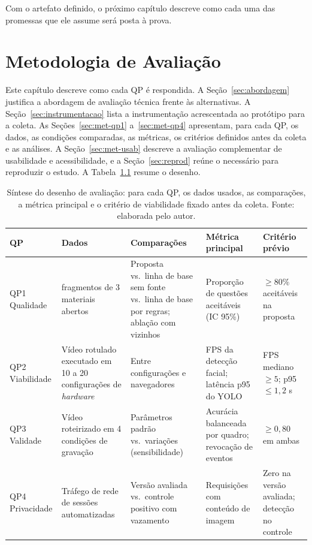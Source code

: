 \documentclass[portuguese,oneside]{tcc}
\newcommand{\estr}[1]{\emph{#1}}
\begin{document}
Com o artefato definido, o próximo capítulo descreve como cada uma das promessas que ele assume será posta à prova.

\chapter{\label{chap:metodo}Metodologia de Avaliação}

Este capítulo descreve como cada QP é respondida. A Seção~\ref{sec:abordagem} justifica a abordagem de avaliação técnica frente às alternativas. A Seção~\ref{sec:instrumentacao} lista a instrumentação acrescentada ao protótipo para a coleta. As Seções~\ref{sec:met-qp1} a~\ref{sec:met-qp4} apresentam, para cada QP, os dados, as condições comparadas, as métricas, os critérios definidos antes da coleta e as análises. A Seção~\ref{sec:met-usab} descreve a avaliação complementar de usabilidade e acessibilidade, e a Seção~\ref{sec:reprod} reúne o necessário para reproduzir o estudo. A Tabela~\ref{tab:sintese-metodo} resume o desenho.

\begin{table}[htbp]
\centering
\caption{Síntese do desenho de avaliação: para cada QP, os dados usados, as comparações, a métrica principal e o critério de viabilidade fixado antes da coleta. Fonte: elaborada pelo autor.}
\label{tab:sintese-metodo}
\small
\begin{tabularx}{\textwidth}{>{\raggedright\arraybackslash}p{1.6cm} >{\raggedright\arraybackslash}X >{\raggedright\arraybackslash}X >{\raggedright\arraybackslash}X >{\raggedright\arraybackslash}X}
\toprule
QP & Dados & Comparações & Métrica principal & Critério prévio \\
\midrule
QP1 Qualidade & 90 fragmentos de 3 materiais abertos & Proposta vs.\ linha de base sem fonte vs.\ linha de base por regras; ablação com vizinhos & Proporção de questões aceitáveis (IC 95\%) & $\ge 80\%$ aceitáveis na proposta \\
QP2 Viabilidade & Vídeo rotulado executado em 10 a 20 configurações de \estr{hardware} & Entre configurações e navegadores & FPS da detecção facial; latência p95 do YOLO & FPS mediano $\ge 5$; p95 $\le 1{,}2$ s \\
QP3 Validade & Vídeo roteirizado em 4 condições de gravação & Parâmetros padrão vs.\ variações (sensibilidade) & Acurácia balanceada por quadro; revocação de eventos & $\ge 0{,}80$ em ambas \\
QP4 Privacidade & Tráfego de rede de sessões automatizadas & Versão avaliada vs.\ controle positivo com vazamento & Requisições com conteúdo de imagem & Zero na versão avaliada; detecção no controle \\
\bottomrule
\end{tabularx}
\end{table}
\end{document}
